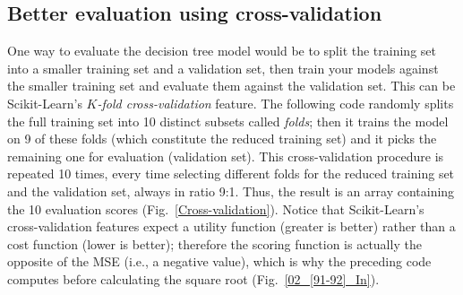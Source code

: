 \subsection{Better evaluation using cross-validation}\label{sec:cross-validation}
One way to evaluate the decision tree model would be to split the training set into a smaller training set and a validation set, then train your models against the smaller training set and evaluate them against the validation set. This can be Scikit-Learn's \emph{$K$-fold cross-validation} feature. The following code randomly splits the full training set into 10 distinct subsets called \emph{folds}; then it trains the model on 9 of these folds (which constitute the reduced training set) and it picks the remaining one for evaluation (validation set). This cross-validation procedure is repeated 10 times, every time selecting different folds for the reduced training set and the validation set, always in ratio 9:1. Thus, the result is an array containing the 10 evaluation scores (Fig.~\ref{Cross-validation}).
Notice that Scikit-Learn's cross-validation features expect a utility function (greater is better) rather than a cost function (lower is better); therefore the scoring function is actually the opposite of the MSE (i.e., a negative value), which is why the preceding code computes  before calculating the square root (Fig.~\ref{02_[91-92]_In}).
